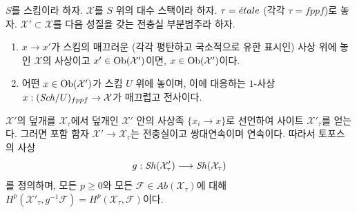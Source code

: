 \begin{lemma}
\label{lemma-cohomology-on-subcategory}
$S$를 스킴이라 하자. $\mathcal{X}$를 $S$ 위의 대수 스택이라 하자.
$\tau = {\acute{e}tale}$ (각각 $\tau = fppf$)로 놓자.
$\mathcal{X}' \subset \mathcal{X}$를 다음 성질을 갖는 전충실
부분범주라 하자.
\begin{enumerate}
\item $x \to x'$가 스킴의 매끄러운
(각각 평탄하고 국소적으로 유한 표시인) 사상 위에 놓인
$\mathcal{X}$의 사상이고 $x' \in \mathop{\mathrm{Ob}}\nolimits(\mathcal{X}')$이면,
$x \in \mathop{\mathrm{Ob}}\nolimits(\mathcal{X}')$이다.
\item 어떤 $x \in \mathop{\mathrm{Ob}}\nolimits(\mathcal{X}')$가 스킴 $U$ 위에 놓이며,
이에 대응하는 $1$-사상
$x : (\mathit{Sch}/U)_{fppf} \to \mathcal{X}$가 매끄럽고 전사이다.
\end{enumerate}
 $\mathcal{X}'$의 덮개를 $\mathcal{X}_\tau$에서 덮개인
$\mathcal{X}'$ 안의 사상족 $\{x_i \to x\}$로 선언하여
사이트 $\mathcal{X}'_\tau$를 얻는다. 그러면 포함 함자
$\mathcal{X}' \to \mathcal{X}_\tau$는 전충실이고 쌍대연속이며
연속이다. 따라서 토포스의 사상
$$
g : \mathop{\mathit{Sh}}\nolimits(\mathcal{X}'_\tau) \longrightarrow \mathop{\mathit{Sh}}\nolimits(\mathcal{X}_\tau)
$$
를 정의하며, 모든 $p \geq 0$와 모든
$\mathcal{F} \in \textit{Ab}(\mathcal{X}_\tau)$에 대해
$H^p(\mathcal{X}'_\tau, g^{-1}\mathcal{F}) =
H^p(\mathcal{X}_\tau, \mathcal{F})$이다.
\end{lemma}


